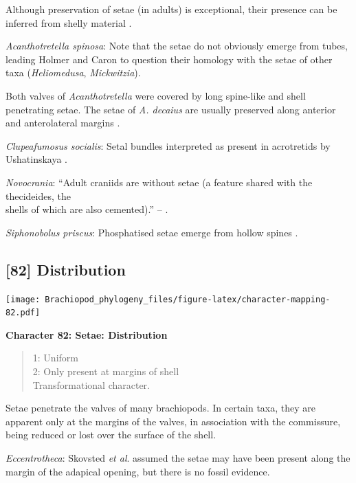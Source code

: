 \documentclass[openany]{book}
\theoremstyle{definition}
\theoremstyle{definition}
\theoremstyle{definition}
\theoremstyle{remark}
\begin{document}
Although preservation of setae (in adults) is exceptional, their
presence can be inferred from shelly material
\citep[see][]{Holmer2006Aspinose}.

\hypertarget{Acanthotretella_spinosa-coding-81}{}
\emph{Acanthotretella spinosa}: Note that the setae do not obviously
emerge from tubes, leading Holmer and Caron to question their homology
with the setae of other taxa (\emph{Heliomedusa}, \emph{Mickwitzia}).

Both valves of \emph{Acanthotretella} were covered by long spine-like
and shell penetrating setae. The setae of \emph{A. decaius} are usually
preserved along anterior and anterolateral margins
\citep{Hu2010Softpart}.

\hypertarget{Clupeafumosus_socialis-coding-81}{}
\emph{Clupeafumosus socialis}: Setal bundles interpreted as present in
acrotretids by Ushatinskaya \citeyearpar{Ushatinskaya2016Protegulumand}.

\hypertarget{Novocrania-coding-81}{}
\emph{Novocrania}: ``Adult craniids are without setae (a feature shared
with the thecideides, the\\
shells of which are also cemented).'' -- \citet{Williams2007Supplement}.

\hypertarget{Siphonobolus_priscus-coding-81}{}
\emph{Siphonobolus priscus}: Phosphatised setae emerge from hollow
spines \citep{Popov2009Earlyontogeny}.

\subsection*{{[}82{]} Distribution}\label{distribution}

\texttt{[image: Brachiopod\_phylogeny\_files/figure-latex/character-mapping-82.pdf]}

\textbf{Character 82: Setae: Distribution}

\begin{quote}
1: Uniform\\
2: Only present at margins of shell\\
Transformational character.
\end{quote}

Setae penetrate the valves of many brachiopods. In certain taxa, they
are apparent only at the margins of the valves, in association with the
commissure, being reduced or lost over the surface of the shell.

\hypertarget{Eccentrotheca-coding-82}{}
\emph{Eccentrotheca}: Skovsted \emph{et al}.
\citeyearpar{Skovsted2011Scleritomeconstruction} assumed the setae may
have been present along the margin of the adapical opening, but there is
no fossil evidence.
\end{document}
